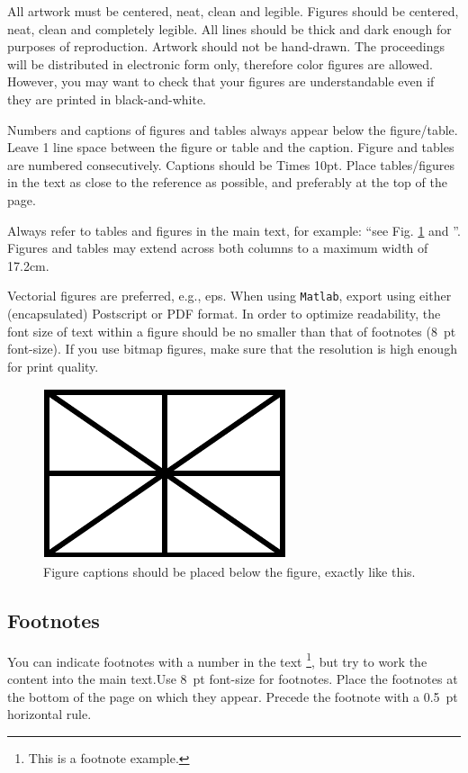 \documentclass{article}
\begin{document}
All artwork must be centered, neat, clean and legible. Figures should be centered, neat, clean
and completely legible. All lines should be thick and dark enough for purposes of reproduction. Artwork should not be hand-drawn. The proceedings will be distributed in electronic form only, therefore color figures are allowed. However, you may want to check that your figures are understandable even if they are printed in black-and-white.


Numbers and captions of figures and tables always appear below the figure/table.
Leave 1 line space between the figure or table and the caption.
Figure and tables are numbered consecutively. 
Captions should be Times 10pt. Place tables/figures in the text as close to the reference as possible, 
and preferably at the top of the page.

Always refer to tables and figures in the main text, for example: ``see Fig. \ref{fig:example} and ''.
Figures and tables may extend across both columns to a maximum width of 17.2cm.

Vectorial figures are preferred, e.g., eps. When using \texttt{Matlab}, export using either (encapsulated) Postscript or PDF format. In order to optimize readability, the font size of text within a figure should be no smaller than
that of footnotes (8~pt font-size). If you use bitmap figures, make sure that the resolution is high enough for print quality. 

\begin{figure}[t]
\centering
\includegraphics[width=0.6\columnwidth]{figure}
\caption{Figure captions should be placed below the figure, 
exactly like this.\label{fig:example}}
\end{figure}


\subsection{Footnotes}
You can indicate footnotes with a number in the text \footnote{This is a footnote example.},
but try to work the content into the main text.Use 8~pt font-size for footnotes.  Place the footnotes at the bottom of the page 
on which they appear. Precede the footnote with a 0.5~pt horizontal rule.
\end{document}
